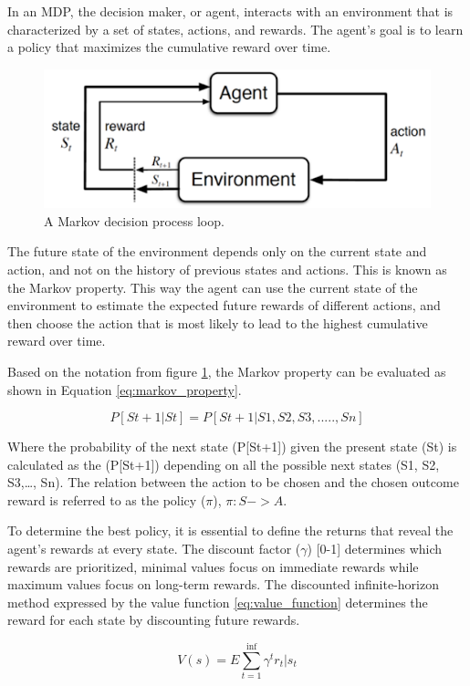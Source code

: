 In an MDP, the decision maker, or agent, interacts with an environment that is characterized by a set of states, actions, and rewards. The agent's goal is to learn a policy that maximizes the cumulative reward over time.

\begin{figure}[!htp]
    \centering
    \includegraphics[width=.6\textwidth]{fig/rl/MDP-model.png}
    \caption{A Markov decision process loop.}
    \label{fig:MDP}
\end{figure}

The future state of the environment depends only on the current state and action, and not on the history of previous states and actions. This is known as the Markov property. This way the agent can use the current state of the environment to estimate the expected future rewards of different actions, and then choose the action that is most likely to lead to the highest cumulative reward over time.

Based on the notation from figure \ref{fig:MDP}, the Markov property can be evaluated as shown in Equation \ref{eq:markov_property}.

\begin{equation}
    \label{eq:markov_property}
    P[St+1|St] = P[St+1|S1,S2,S3,.....,Sn]
\end{equation}

Where the probability of the next state (P[St+1]) given the present state (St) is calculated as the (P[St+1]) depending on all the possible next states (S1, S2, S3,\dots, Sn).
The relation between the action to be chosen and the chosen outcome reward is referred to as the policy ($\pi$), $\pi: S -> A$.

To determine the best policy, it is essential to define the returns that reveal the agent's rewards at every state. The discount factor ($\gamma$) [0-1] determines which rewards are prioritized, minimal values focus on immediate rewards while maximum values focus on long-term rewards. The discounted infinite-horizon method expressed by the value function \ref{eq:value_function} determines the reward for each state by discounting future rewards.

\begin{equation}
    \label{eq:value_function}
    V(s) = E \sum_{t=1}^{\inf}\gamma^t r_t|s_t
\end{equation}


